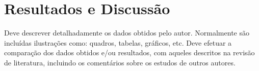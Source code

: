 
\chapter{Resultados e Discussão}\label{cap:resultadosediscussao}

Deve descrever detalhadamente os dados obtidos pelo autor. Normalmente são incluídas ilustrações como: quadros, tabelas, gráficos, etc. Deve efetuar a comparação dos dados obtidos e/ou resultados, com aqueles descritos na revisão de literatura, incluindo os comentários sobre os estudos de outros autores.
